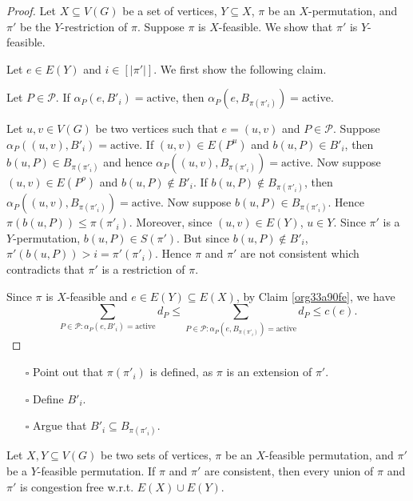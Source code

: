 \documentclass[fontsize=11pt,paper=a4]{book}
\begin{document}
\begin{proof}
Let \(X\subseteq V(G)\) be a set of vertices, \(Y\subseteq X\), \(\pi\) be an \(X\)-permutation, and \(\pi'\) be the \(Y\)-restriction of \(\pi\).
Suppose \(\pi\) is \(X\)-feasible.
We show that \(\pi'\) is \(Y\)-feasible.

Let \(e\in E(Y)\) and \(i\in[\lvert\pi'\rvert]\).
We first show the following claim.

\begin{claim}
Let \(P\in\mathcal{P}\).
If \(\alpha_P(e,B'_i)=\mathrm{active}\), then \(\alpha_P(e,B_{\pi(\pi'_i)})=\mathrm{active}\).
\label{org33a90fe}
\end{claim}

\begin{proof2}
Let \(u,v\in V(G)\) be two vertices such that \(e=(u,v)\) and \(P\in\mathcal{P}\).
Suppose \(\alpha_P((u,v),B'_i)=\mathrm{active}\).
If \((u,v)\in E(P^u)\) and \(b(u,P)\in B'_i\), then \(b(u,P)\in B_{\pi(\pi'_i)}\) and hence \(\alpha_P((u,v),B_{\pi(\pi'_i)})=\mathrm{active}\).
Now suppose \((u,v)\in E(P^o)\) and \(b(u,P)\notin B'_i\).
If \(b(u,P)\notin B_{\pi(\pi'_i)}\), then \(\alpha_P((u,v),B_{\pi(\pi'_i)})=\mathrm{active}\).
Now suppose \(b(u,P)\in B_{\pi(\pi'_i)}\).
Hence \(\pi(b(u,P))\leq \pi(\pi'_i)\).
Moreover, since \((u,v)\in E(Y)\), \(u\in Y\).
Since \(\pi'\) is a \(Y\)-permutation, \(b(u,P)\in S(\pi')\).
But since \(b(u,P)\notin B'_i\), \(\pi'(b(u,P))>i=\pi'(\pi'_i)\).
Hence \(\pi\) and \(\pi'\) are not consistent which contradicts that \(\pi'\) is a restriction of \(\pi\).
\end{proof2}

Since \(\pi\) is \(X\)-feasible and \(e\in E(Y)\subseteq E(X)\), by Claim \ref{org33a90fe}, we have
\[
\sum_{P\in\mathcal{P}:\alpha_P(e,B'_i)=\mathrm{active}}d_P\leq\sum_{P\in\mathcal{P}:\alpha_P(e,B_{\pi(\pi'_i)})=\mathrm{active}}d_P\leq c(e).
\]
\end{proof}

\begin{itemize}
\item[{$\square$}] Point out that \(\pi(\pi'_i)\) is defined, as \(\pi\) is an extension of \(\pi'\).
\item[{$\square$}] Define \(B'_i\).
\item[{$\square$}] Argue that \(B'_i\subseteq B_{\pi(\pi'_i)}\).
\end{itemize}

\begin{lem}
Let \(X,Y\subseteq V(G)\) be two sets of vertices, \(\pi\) be an \(X\)-feasible permutation, and \(\pi'\) be a \(Y\)-feasible permutation.
If \(\pi\) and \(\pi'\) are consistent, then every union of \(\pi\) and \(\pi'\) is congestion free w.r.t. \(E(X)\cup E(Y)\).
\label{org199dc38}
\end{lem}
\end{document}
